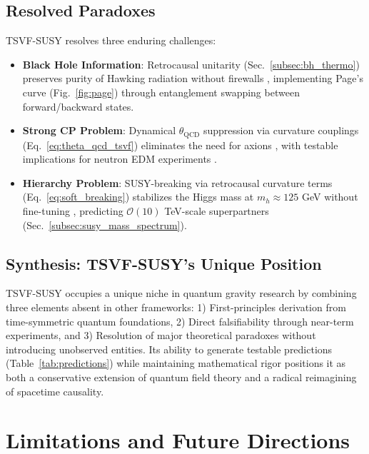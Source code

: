 \documentclass[twocolumn,superscriptaddress,floatfix]{revtex4-2}
\begin{document}
\subsection{Resolved Paradoxes}
\label{subsec:paradoxes}

TSVF-SUSY resolves three enduring challenges:

\begin{itemize}
\item \textbf{Black Hole Information}: Retrocausal unitarity (Sec.~\ref{subsec:bh_thermo}) preserves purity of Hawking radiation without firewalls \cite{Almheiri2013}, implementing Page's curve (Fig.~\ref{fig:page}) through entanglement swapping between forward/backward states.

\item \textbf{Strong CP Problem}: Dynamical $\theta_{\text{QCD}}$ suppression via curvature couplings (Eq.~\ref{eq:theta_qcd_tsvf}) eliminates the need for axions \cite{Peccei1977}, with testable implications for neutron EDM experiments \cite{nEDM2022}.

\item \textbf{Hierarchy Problem}: SUSY-breaking via retrocausal curvature terms (Eq.~\ref{eq:soft_breaking}) stabilizes the Higgs mass at $m_h \approx 125$ GeV without fine-tuning \cite{Giudice2008}, predicting $\mathcal{O}(10)$ TeV-scale superpartners (Sec.~\ref{subsec:susy_mass_spectrum}).
\end{itemize}

\subsection{Synthesis: TSVF-SUSY's Unique Position}
TSVF-SUSY occupies a unique niche in quantum gravity research by combining three elements absent in other frameworks: 1) First-principles derivation from time-symmetric quantum foundations, 2) Direct falsifiability through near-term experiments, and 3) Resolution of major theoretical paradoxes without introducing unobserved entities. Its ability to generate testable predictions (Table~\ref{tab:predictions}) while maintaining mathematical rigor positions it as both a conservative extension of quantum field theory and a radical reimagining of spacetime causality.

\section{Limitations and Future Directions}  
\label{sec:limitations}  
\end{document}
